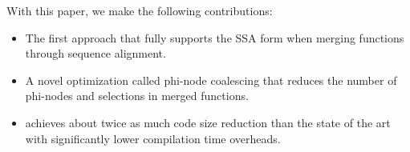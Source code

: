 With this paper, we make the following contributions:
\begin{itemize}
  \item The first approach that fully supports the SSA form when merging functions through sequence alignment.
  \item A novel optimization called phi-node coalescing that reduces the number of phi-nodes and selections in merged functions.
  \item {\ProjName} achieves about twice as much code size reduction than the state of the art with significantly lower compilation time
        overheads.
\end{itemize}








